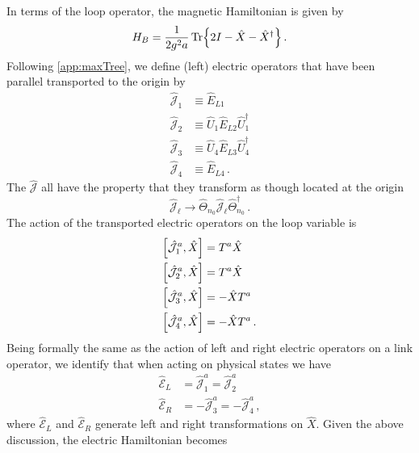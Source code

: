 \documentclass[reprint,superscriptaddress,pra,nofootinbib,preprintnumbers,floatfix]{revtex4-1}
\begin{document}
In terms of the loop operator, the magnetic Hamiltonian is given by
%
\begin{equation}
\label{eq:gauge_fixed_magnetic_ham}
    H_B = \frac{1}{2g^2 a}\Tr {  2I - \hat{X} - \hat{X}^\dagger } \,.
\end{equation}
%
Following \cref{app:maxTree}, we define (left) electric operators that have been parallel transported to the origin by
%
\begin{equation}
  \begin{split}
    \hat{\mathcal{J}}_1 &\equiv \hat{E}_{L1} \\
    \hat{\mathcal{J}}_2 &\equiv \hat{U}_1 \hat{E}_{L2} \hat{U}_1^\dagger \\
    \hat{\mathcal{J}}_3 &\equiv \hat{U}_4 \hat{E}_{L3} \hat{U}_4^\dagger \\
    \hat{\mathcal{J}}_4 &\equiv \hat{E}_{L4}
    \,.
  \end{split}
\end{equation}
%
The $\hat{\mathcal{J}}$ all have the property that they transform as though located at the origin
\begin{equation}
    \hat{\mathcal{J}}_{\ell}
      \to \hat{\Theta}_{n_0} \hat{\mathcal{J}}_{\ell} \hat{\Theta}_{n_0}^\dagger \,.
\end{equation}
%
The action of the transported electric operators on the loop variable is
%
\begin{equation}
\begin{split}
    \comm{\hat{\mathcal{J}}^a_1}{\hat{X}} &= T^a \hat{X} \\
    \comm{\hat{\mathcal{J}}^a_2}{\hat{X}} &= T^a \hat{X} \\
    \comm{\hat{\mathcal{J}}^a_3}{\hat{X}} &= - \hat{X} T^a \\
    \comm{\hat{\mathcal{J}}^a_4}{\hat{X}} &= - \hat{X} T^a \,.
\end{split}
\end{equation}
%
Being formally the same as the action of left and right electric operators on a link operator, we identify that when acting on physical states we have
%
\begin{align}
    \hat{\mathcal{E}}_L &= \hat{\mathcal{J}}^a_1 = \hat{\mathcal{J}}^a_2 \, \\
    \hat{\mathcal{E}}_R &= -\hat{\mathcal{J}}^a_3 = -\hat{\mathcal{J}}^a_4 \,,
\end{align}
%
where $\hat{\mathcal{E}}_L$ and $\hat{\mathcal{E}}_R$ generate left and right transformations on $\hat{X}$. 
%
Given the above discussion, the electric Hamiltonian becomes
\end{document}
